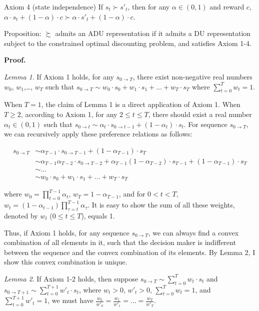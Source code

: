 \documentclass[
  12pt,
]{article}
\begin{document}
Axiom 4 (state independence) If \(s_t \succ s'_t\), then for any
\(\alpha \in (0,1)\) and reward \(c\),
\(\alpha \cdot s_t + (1-\alpha)\cdot c \succ \alpha \cdot s'_t + (1-\alpha)\cdot c\).

Proposition: \(\succsim\) admits an ADU representation if it admits a DU
representation subject to the constrained optimal discounting problem,
and satisfies Axiom 1-4.

\textbf{Proof.}

\emph{Lemma 1}. If Axiom 1 holds, for any \(s_{0\rightarrow T}\), there
exist non-negative real numbers \(w_0\), \(w_1\),\ldots, \(w_T\) such
that
\(s_{0\rightarrow T} \sim w_0 \cdot s_0 +w_1\cdot s_1 + ...+w_T\cdot s_T\)
where \(\sum_{t=0}^T w_t=1\).

When \(T=1\), the claim of Lemma 1 is a direct application of Axiom 1.
When \(T\geq 2\), according to Axiom 1, for any \(2\leq t\leq T\), there
should exist a real number \(\alpha_t\in(0,1)\) such that
\(s_{0\rightarrow t}\sim \alpha_t\cdot s_{0\rightarrow t-1}+(1-\alpha_t)\cdot s_{t}\).
For sequence \(s_{0\rightarrow T}\), we can recursively apply these
preference relations as follows:

\[
\begin{aligned}
s_{0\rightarrow T} &\sim \alpha_{T-1}\cdot s_{0\rightarrow T-1} + (1-\alpha_{T-1})\cdot s_T \\
&\sim  \alpha_{T-1}\alpha_{T-2}\cdot s_{0\rightarrow T-2} + \alpha_{T-1}(1-\alpha_{T-2})\cdot s_{T-1} + (1-\alpha_{T-1})\cdot s_T \\
& \sim ...\\
& \sim w_0 \cdot s_0 + w_1\cdot s_1 +... +w_T\cdot s_T
\end{aligned}
\]

where \(w_0=\prod_{t=0}^{T-1}\alpha_t\), \(w_T = 1-\alpha_{T-1}\), and
for \(0<t<T\),
\(w_t=(1-\alpha_{t-1})\prod_{\tau=t}^{T-1}\alpha_{\tau}\). It is easy to
show the sum of all these weights, denoted by \(w_t\)
(\(0\leq t\leq T\)), equals 1.

Thus, if Axiom 1 holds, for any sequence \(s_{0\rightarrow T}\), we can
always find a convex combination of all elements in it, such that the
decision maker is indifferent between the sequence and the convex
combination of its elements. By Lemma 2, I show this convex combination
is unique.

\emph{Lemma 2}. If Axiom 1-2 holds, then suppose
\(s_{0\rightarrow T}\sim \sum_{t=0}^T w_t \cdot s_t\) and
\(s_{0\rightarrow T+1} \sim \sum_{t=0}^{T+1} w'_t\cdot s_t\), where
\(w_t >0\), \(w'_t>0\), \(\sum_{t=0}^Tw_t=1\), and
\(\sum_{t=0}^{T+1}w'_t=1\), we must have
\(\frac{w_0}{w'_0}=\frac{w_1}{w'_1}=…=\frac{w_T}{w'_T}\).
\end{document}

